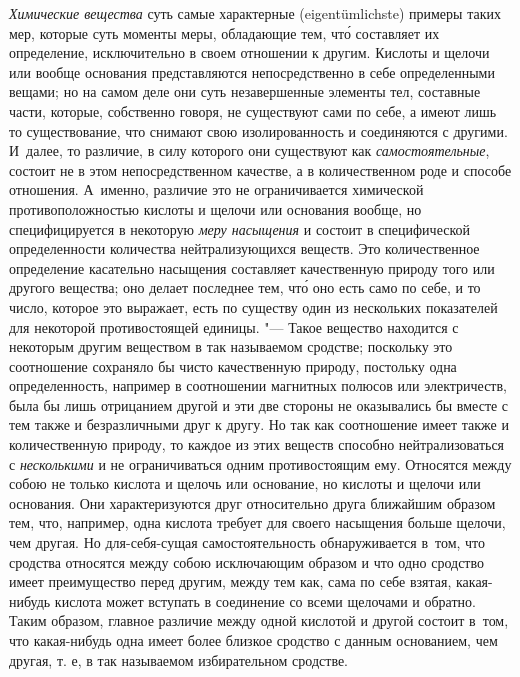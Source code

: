 {\em Химические вещества} суть самые характерные (eigent\-ümlich\-ste) примеры
таких мер, которые суть моменты меры, обладающие тем, чт\'{о} составляет их
определение, исключительно в своем отношении к другим. Кислоты и щелочи или
вообще основания представляются непосредственно в себе определенными вещами; но
на самом деле они суть незавершенные элементы тел, составные части, которые,
собственно говоря, не существуют сами по себе, а имеют лишь то существование,
что снимают свою изолированность и соединяются с другими. И~далее, то различие,
в силу которого они существуют как {\em самостоятельные}, состоит не в этом
непосредственном качестве, а в количественном роде и способе отношения.
А~именно, различие это не ограничивается химической противоположностью кислоты
и щелочи или основания вообще, но специфицируется в некоторую
{\em меру насыщения} и состоит в специфической определенности количества
нейтрализующихся веществ. Это количественное определение касательно насыщения
составляет качественную природу того или другого вещества; оно делает последнее
тем, чт\'{о} оно есть само по себе, и то число, которое это выражает, есть по
существу один из нескольких показателей для некоторой противостоящей единицы.
"--- Такое вещество находится с некоторым другим веществом в так называемом
сродстве; поскольку это соотношение сохраняло бы чисто качественную природу,
постольку одна определенность, например в соотношении магнитных полюсов или
электричеств, была бы лишь отрицанием другой и эти две стороны не оказывались
бы вместе с тем также и безразличными друг к другу. Но так как соотношение
имеет также и количественную природу, то каждое из этих веществ способно
нейтрализоваться с {\em несколькими} и не ограничиваться одним противостоящим
ему. Относятся между собою не только кислота и щелочь или основание, но кислоты
и щелочи или основания. Они характеризуются друг относительно друга ближайшим
образом тем, что, например, одна кислота требует для своего насыщения больше
щелочи, чем другая. Но для-себя-сущая самостоятельность обнаруживается в~том,
что сродства относятся между собою исключающим образом и что одно сродство
имеет преимущество перед другим, между тем как, сама по себе взятая,
какая-нибудь кислота может вступать в соединение со всеми щелочами и обратно.
Таким образом, главное различие между одной кислотой и другой состоит в~том,
что какая-нибудь одна имеет более близкое сродство с данным основанием, чем
другая, т. е, в так называемом избирательном сродстве.

